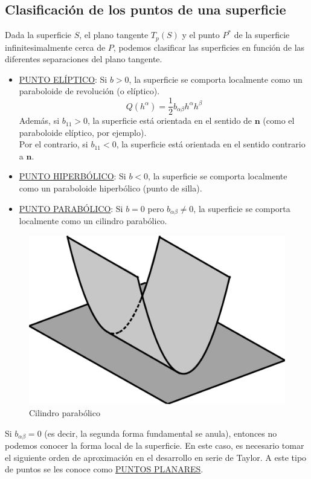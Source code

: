 \subsection{Clasificación de los puntos de una superficie}
Dada la superficie $S$, el plano tangente $T_p(S)$ y el punto $P^*$ de la superficie infinitesimalmente cerca de $P$, podemos clasificar las superficies en función de las diferentes separaciones del plano tangente.
\begin{itemize}
    \item \underline{PUNTO ELÍPTICO}: Si $b>0$, la superficie se comporta localmente como un paraboloide de revolución (o elíptico).
    $$
    Q(h^\alpha )=\frac{1}{2}b_{\alpha \beta }h^\alpha h^\beta 
    $$
    Además, si $b_{11}>0$, la superficie está orientada en el sentido de $\mathbf{n}$ (como el paraboloide elíptico, por ejemplo).\\
    Por el contrario, si $b_{11}<0$, la superficie está orientada en el sentido contrario a $\mathbf{n}$.

    \item \underline{PUNTO HIPERBÓLICO}: Si $b<0$, la superficie se comporta localmente como un paraboloide hiperbólico (punto de silla).
    \item \underline{PUNTO PARABÓLICO}: Si $b=0$ pero $b_{\alpha \beta }\neq 0$, la superficie se comporta localmente como un cilindro parabólico.
\end{itemize}

    \begin{figure}
    \centering
        \includegraphics[scale=.3]{FOTOS/punto_parabolico.png}
        \caption*{Cilindro parabólico}
    \end{figure}
Si $b_{\alpha \beta}=0$ (es decir, la segunda forma fundamental se anula), entonces no podemos conocer la forma local de la superficie. En este caso, es necesario tomar el siguiente orden de aproximación en el desarrollo en serie de Taylor. A este tipo de puntos se les conoce como \underline{PUNTOS PLANARES}.\\

